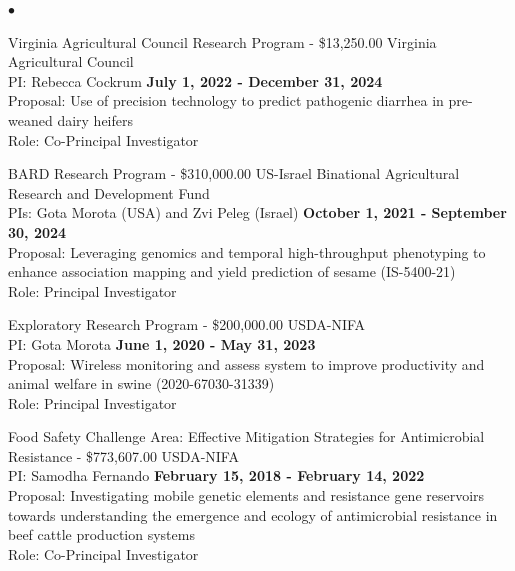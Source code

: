 \documentclass[margin,line,10pt]{res}
\newenvironment{list2}{
  \begin{list}{$\bullet$}{%
      \setlength{\itemsep}{0in}
      \setlength{\parsep}{0in} \setlength{\parskip}{0in}
      \setlength{\topsep}{0in} \setlength{\partopsep}{0in} 
      \setlength{\leftmargin}{0.2in}}}{\end{list}}
\begin{document}
\begin{resume}
\begin{list2}
  \item Virginia Agricultural Council Research Program - \$13,250.00  \hfill Virginia Agricultural Council \\
  PI: Rebecca Cockrum  \hfill \textbf{July 1, 2022 - December 31, 2024}\\
Proposal: Use of precision technology to predict pathogenic diarrhea in pre-weaned dairy heifers  \\
Role: Co-Principal Investigator \\

\vspace{0.5cm}


\item BARD Research Program - \$310,000.00  \hfill US-Israel Binational Agricultural Research and Development Fund  \\
  PIs: Gota Morota (USA) and Zvi Peleg (Israel)   \hfill \textbf{October 1, 2021 -  September 30, 2024}\\
Proposal: Leveraging genomics and temporal high-throughput phenotyping to enhance association mapping and yield prediction of sesame (IS-5400-21) \\
Role: Principal Investigator \\


\vspace{0.5cm}


\item Exploratory Research Program - \$200,000.00  \hfill USDA-NIFA \\
  PI: Gota Morota   \hfill \textbf{June 1, 2020 -  May 31, 2023}\\
Proposal: Wireless monitoring and assess system to improve productivity and animal welfare in swine (2020-67030-31339) \\
Role: Principal Investigator \\


\vspace{0.5cm}


\item Food Safety Challenge Area: Effective Mitigation Strategies for Antimicrobial Resistance  - \$773,607.00  \hfill USDA-NIFA\\
PI: Samodha Fernando   \hfill \textbf{February 15, 2018 - February 14, 2022}\\
Proposal: Investigating mobile genetic elements and resistance gene reservoirs towards understanding the emergence and ecology of antimicrobial resistance in beef cattle production systems  \\
Role: Co-Principal Investigator \\


\end{list2}
\end{resume}
\end{document}
